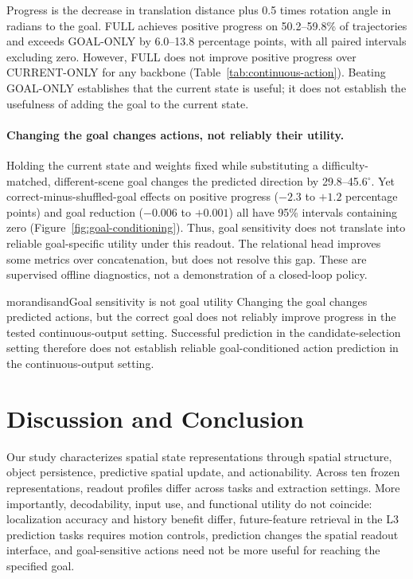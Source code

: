 \documentclass{article} %
\begin{document}
Progress is the decrease in translation distance plus 0.5 times rotation
angle in radians to the goal. FULL achieves positive progress on
50.2--59.8\% of trajectories and exceeds GOAL-ONLY by 6.0--13.8 percentage
points, with all paired intervals excluding zero. However, FULL does not
improve positive progress over CURRENT-ONLY for any backbone
(Table~\ref{tab:continuous-action}). Beating GOAL-ONLY establishes that the
current state is useful; it does not establish the usefulness of adding
the goal to the current state.

\paragraph{Changing the goal changes actions, not reliably their utility.}
Holding the current state and weights fixed while substituting a
difficulty-matched, different-scene goal changes the predicted direction
by 29.8--45.6$^{\circ}$. Yet correct-minus-shuffled-goal effects on
positive progress ($-2.3$ to $+1.2$ percentage points) and goal reduction
($-0.006$ to $+0.001$) all have 95\% intervals containing zero
(Figure~\ref{fig:goal-conditioning}). Thus, goal sensitivity does not
translate into reliable goal-specific utility under this readout. The
relational head improves some metrics over concatenation, but does not
resolve this gap. These are supervised offline diagnostics, not a
demonstration of a closed-loop policy.

\begin{keyfinding}{morandisand}{Goal sensitivity is not goal utility}
Changing the goal changes predicted actions, but the correct goal does
not reliably improve progress in the tested continuous-output setting.
Successful prediction in the candidate-selection setting therefore does not
establish reliable goal-conditioned action prediction in the continuous-output
setting.
\end{keyfinding}


\section{Discussion and Conclusion}
\label{sec:conclusion}
Our study characterizes spatial state representations through spatial
structure, object persistence, predictive spatial update, and actionability.
Across ten frozen representations, readout profiles differ across tasks
and extraction settings. More importantly, decodability, input use, and
functional utility do not coincide: localization accuracy and history
benefit differ, future-feature retrieval in the L3 prediction tasks requires
motion controls,
prediction changes the spatial readout interface, and goal-sensitive
actions need not be more useful for reaching the specified goal.
\end{document}
